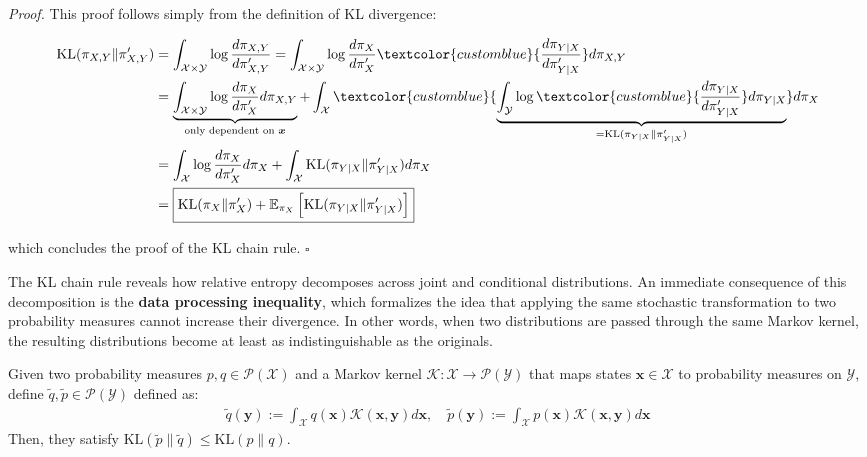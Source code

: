 \documentclass{article}
\newcommand{\boldtext}[1]{\textbf{\textcolor{MyGreen}{#1}}}
\newcommand{\bluetext}[1]{\textcolor{customblue}{#1}}
\begin{document}
\textit{Proof. }This proof follows simply from the definition of KL divergence:
\begin{small}
\begin{align}
    \text{KL}(\pi_{X,Y}\|\pi'_{X,Y})&=\int_{\mathcal{X}\times \mathcal{Y}}\log \frac{d\pi_{X,Y}}{d\pi'_{X,Y}}=\int_{\mathcal{X}\times \mathcal{Y}}\log \frac{d\pi_{X}}{d\pi'_{X}}\bluetext{\frac{d\pi_{Y|X}}{d\pi_{Y|X}'}}d\pi_{X,Y}\nonumber\\
    &=\underbrace{\int_{\mathcal{X}\times \mathcal{Y}}\log \frac{d\pi_{X}}{d\pi'_{X}}d\pi_{X,Y}}_{\text{only dependent on }\boldsymbol{x}}+\int_{\mathcal{X}}\bluetext{\underbrace{\int_{\mathcal{Y}}\log\bluetext{\frac{d\pi_{Y|X}}{d\pi_{Y|X}'}}d\pi_{Y|X}}_{=\text{KL}(\pi_{Y|X}\|\pi_{Y|X}')}}d\pi_{X}\nonumber\\
    &=\int_{\mathcal{X}}\log \frac{d\pi_{X}}{d\pi'_{X}}d\pi_{X}+\int_{\mathcal{X}}\text{KL}(\pi_{Y|X}\|\pi_{Y|X}')d\pi_{X}\nonumber\\
    &=\boxed{\text{KL}(\pi_X\|\pi'_X)+\mathbb{E}_{\pi_X}\left[\text{KL}(\pi_{Y|X}\|\pi_{Y|X}')\right]}
\end{align}
\end{small}
which concludes the proof of the KL chain rule. \hfill $\square$

The KL chain rule reveals how relative entropy decomposes across joint and conditional distributions. An immediate consequence of this decomposition is the \boldtext{data processing inequality}, which formalizes the idea that applying the same stochastic transformation to two probability measures cannot increase their divergence. In other words, when two distributions are passed through the same Markov kernel, the resulting distributions become at least as indistinguishable as the originals.

\begin{lemma}\label{lemma:data-processing-inequality}
    Given two probability measures $p,q\in \mathcal{P}(\mathcal{X})$ and a Markov kernel $\mathcal{K}:\mathcal{X}\to \mathcal{P}(\mathcal{Y})$ that maps states $\boldsymbol{x}\in \mathcal{X}$ to probability measures on $\mathcal{Y}$, define $\tilde{q}, \tilde{p}\in \mathcal{P}(\mathcal{Y})$ defined as:
    \begin{align}
        \tilde{q}(\boldsymbol{y}):=\int_{\mathcal{X}}q(\boldsymbol{x})\mathcal{K}(\boldsymbol{x},\boldsymbol{y})d\boldsymbol{x}, \quad \tilde{p}(\boldsymbol{y}):=\int_{\mathcal{X}}p(\boldsymbol{x})\mathcal{K}(\boldsymbol{x},\boldsymbol{y})d\boldsymbol{x}
    \end{align}
    Then, they satisfy $\text{KL}(\tilde{p}\|\tilde{q})\leq \text{KL}(p\|q)$.
\end{lemma}
\end{document}
